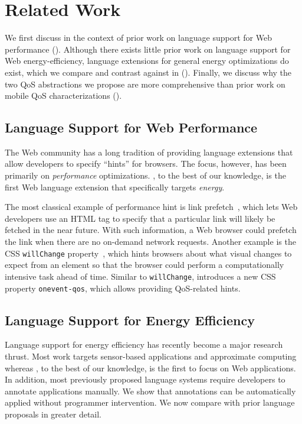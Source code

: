 \section{Related Work}
\label{sec:lang:related}

We first discuss \greenweb in the context of prior work on language support for Web performance (). Although there exists little prior work on language support for Web energy-efficiency, language extensions for general energy optimizations do exist, which we compare and contrast \greenweb against in (). Finally, we discuss why the two QoS abstractions we propose are more comprehensive than prior work on mobile QoS characterizations ().

\subsection{Language Support for Web Performance}
\label{sec:lang:related:perf}

The Web community has a long tradition of providing language extensions that allow developers to specify ``hints'' for browsers. The focus, however, has been primarily on \textit{performance} optimizations. \greenweb, to the best of our knowledge, is the first Web language extension that specifically targets \textit{energy}.

The most classical example of performance hint is link prefetch~\cite{linkprefetch}, which lets Web developers use an HTML tag to specify that a particular link will likely be fetched in the near future. With such information, a Web browser could prefetch the link when there are no on-demand network requests. Another example is the CSS \texttt{willChange} property~\cite{csswillchange}, which hints browsers about what visual changes to expect from an element so that the browser could perform a computationally intensive task ahead of time. Similar to \texttt{willChange}, \greenweb introduces a new CSS property \texttt{onevent-qos}, which allows providing QoS-related hints.

\subsection{Language Support for Energy Efficiency}
\label{sec:lang:related:energy}

Language support for energy efficiency has recently become a major research thrust. Most work targets sensor-based applications and approximate computing whereas \greenweb, to the best of our knowledge, is the first to focus on Web applications. In addition, most previously proposed language systems require developers to annotate applications manually. We show that \greenweb annotations can be automatically applied without programmer intervention. We now compare \greenweb with prior language proposals in greater detail.

